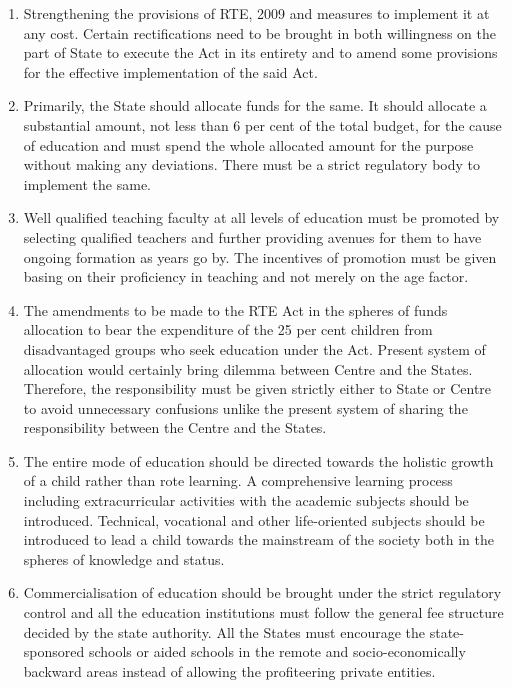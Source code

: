 \begin{multicols}{2}

\begin{enumerate}[label=$-$]
\itemsep=0pt
\item Strengthening the provisions of RTE, 2009 and measures to implement it at any
cost. Certain rectifications need to be brought in both willingness on the part of
State to execute the Act in its entirety and to amend some provisions for the
effective implementation of the said Act.

\item Primarily, the State should allocate funds for the same. It should allocate a
substantial amount, not less than 6 per cent of the total budget, for the cause of
education and must spend the whole allocated amount for the purpose without
making any deviations. There must be a strict regulatory body to implement the
same.

\item Well qualified teaching faculty at all levels of education must be promoted by
selecting qualified teachers and further providing avenues for them to have
ongoing formation as years go by. The incentives of promotion must be given
basing on their proficiency in teaching and not merely on the age factor.

\item The amendments to be made to the RTE Act in the spheres of funds allocation to
bear the expenditure of the 25 per cent children from disadvantaged groups who
seek education under the Act. Present system of allocation would certainly bring
dilemma between Centre and the States. Therefore, the responsibility must be
given strictly either to State or Centre to avoid unnecessary confusions unlike the
present system of sharing the responsibility between the Centre and the States.

\item The entire mode of education should be directed towards the holistic growth of a
child rather than rote learning. A comprehensive learning process including extracurricular activities with the academic subjects should be introduced. Technical, vocational and other life-oriented subjects should be introduced to lead a child
towards the mainstream of the society both in the spheres of knowledge and
status.

\item Commercialisation of education should be brought under the strict regulatory
control and all the education institutions must follow the general fee structure
decided by the state authority. All the States must encourage the state-sponsored
schools or aided schools in the remote and socio-economically backward areas
instead of allowing the profiteering private entities.


\end{enumerate}
\end{multicols}
